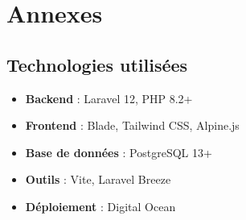 \documentclass[12pt,a4paper]{article}
\begin{document}
\section{Annexes}

\subsection{Technologies utilis\'ees}
\begin{itemize}
    \item \textbf{Backend} : Laravel 12, PHP 8.2+
    \item \textbf{Frontend} : Blade, Tailwind CSS, Alpine.js
    \item \textbf{Base de donn\'ees} : PostgreSQL 13+
    \item \textbf{Outils} : Vite, Laravel Breeze
    \item \textbf{D\'eploiement} : Digital Ocean
\end{itemize}
\end{document}
